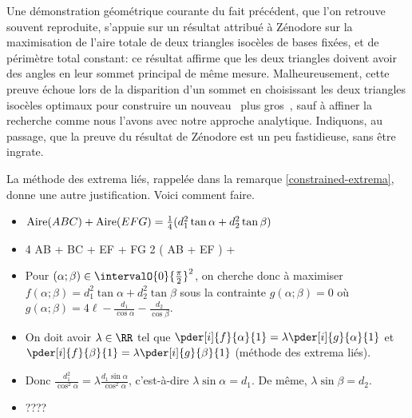 \begin{remark}
	Une démonstration géométrique courante du fait précédent, que l'on retrouve souvent reproduite, s'appuie sur un résultat attribué à Zénodore sur la maximisation de l'aire totale de deux triangles isocèles de bases fixées, et de périmètre total constant:
	ce résultat affirme que les deux triangles doivent avoir des angles en leur sommet principal de même mesure.
	Malheureusement, cette preuve échoue lors de la disparition d'un sommet en choisissant les deux triangles isocèles optimaux pour construire un nouveau \ngone\ \og plus gros \fg\,, sauf à affiner la recherche comme nous l'avons avec notre approche analytique.
	Indiquons, au passage, que la preuve du résultat de Zénodore est un peu fastidieuse, sans être ingrate.
\end{remark}
	



\begin{remark}
	La méthode des extrema liés, rappelée dans la remarque \ref{constrained-extrema}, donne une autre justification. Voici comment faire.
	\begin{itemize}
		\item $\mathrm{Aire}(ABC) + \mathrm{Aire}(EFG) = \frac14 ( d_1^2 \tan \alpha + d_2^2 \tan \beta )$

		\item
		\begin{stepcalc}[style=sar]
			4 \ell
		\explnext{}
			AB + BC + EF + FG
		\explnext{}
			2 ( AB + EF )
		\explnext{}
			 + 
		\end{stepcalc}

		\item Pour $(\alpha ; \beta) \in \intervalO{0}{\frac{\pi}{2}}^2$, on cherche donc à maximiser $f(\alpha ; \beta) =  d_1^2 \tan \alpha + d_2^2 \tan \beta$ sous la contrainte $g(\alpha ; \beta) = 0$ où $g(\alpha ; \beta) = 4 \ell - \frac{d_1}{\cos \alpha} - \frac{d_2}{\cos \beta}$.

		\item On doit avoir $\lambda \in \RR$ tel que
    	$\pder[i]{f}{\alpha}{1} = \lambda \pder[i]{g}{\alpha}{1}$ et
    	$\pder[i]{f}{\beta}{1} = \lambda \pder[i]{g}{\beta}{1}$
		(méthode des extrema liés).

		\item Donc
    	$\frac{d_1^2}{\cos^2 \alpha} = \lambda \frac{d_1 \sin \alpha}{\cos^2 \alpha}$,
		c'est-à-dire
		$\lambda \sin \alpha = d_1$.
		De même,
		$\lambda \sin \beta = d_2$.
	
		\item ????
	\end{itemize}
\end{remark}


